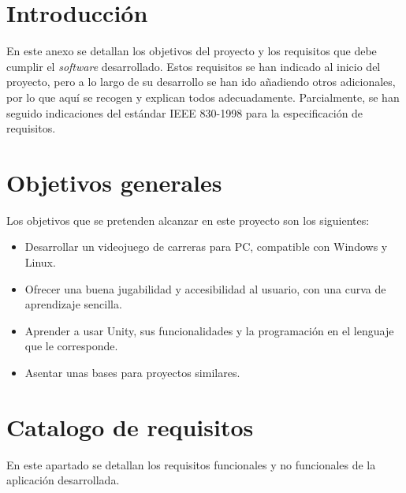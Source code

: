  \label{requisitos}

\section{Introducción}

En este anexo se detallan los objetivos del proyecto y los requisitos que debe cumplir el \textit{software} desarrollado. Estos requisitos se han indicado al inicio del proyecto, pero a lo largo de su desarrollo se han ido añadiendo otros adicionales, por lo que aquí se recogen y explican todos adecuadamente. Parcialmente, se han seguido indicaciones del estándar IEEE 830-1998 para la especificación de requisitos.

\section{Objetivos generales}

Los objetivos que se pretenden alcanzar en este proyecto son los siguientes:

\begin{itemize}
\tightlist
	\item Desarrollar un videojuego de carreras para PC, compatible con Windows y Linux.
	\item Ofrecer una buena jugabilidad y accesibilidad al usuario, con una curva de aprendizaje sencilla.
	\item Aprender a usar Unity, sus funcionalidades y la programación en el lenguaje que le corresponde.
	\item Asentar unas bases para proyectos similares.
\end{itemize}

\section{Catalogo de requisitos}

En este apartado se detallan los requisitos funcionales y no funcionales de la aplicación desarrollada.

